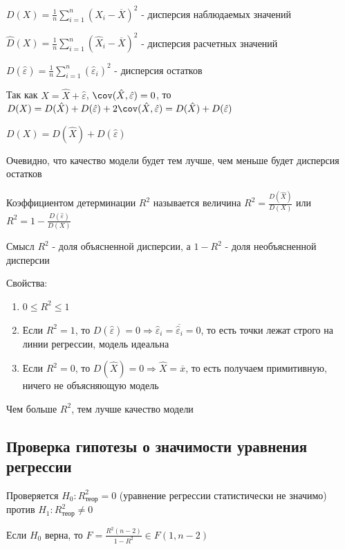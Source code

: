 \Def $D(X) = \frac{1}{n} \sum_{i = 1}^n (X_i - \overline{X})^2$ - дисперсия наблюдаемых значений

\Defs $\hat D(X) = \frac{1}{n} \sum_{i = 1}^n (\hat X_i - \overline{X})^2$ - дисперсия расчетных значений

\Defs $D(\hat \varepsilon) = \frac{1}{n} \sum_{i = 1}^n (\hat \varepsilon_i)^2$ - дисперсия остатков

Так как $X = \hat X + \hat \varepsilon$, $\cov (\hat X, \hat \varepsilon) = 0$, то $D(X) = D(\hat X) + D(\hat \varepsilon) + 2\cov (\hat X, \hat \varepsilon) = D(\hat X) + D(\hat \varepsilon)$

\begin{MyTheorem}
    \Ths $D(X) = D(\hat X) + D(\hat \varepsilon)$
\end{MyTheorem}

Очевидно, что качество модели будет тем лучше, чем меньше будет дисперсия остатков

\Def Коэффициентом детерминации $R^2$ называется величина $R^2 = \frac{D(\hat X)}{D(X)}$ или $R^2 = 1 - \frac{D(\hat \varepsilon)}{D(X)}$

\Notas Смысл $R^2$ - доля объясненной дисперсии, а $1 - R^2$ - доля необъясненной дисперсии

Свойства: 

\begin{enumerate}
    \item $0 \leq R^2 \leq 1$
    \item Если $R^2 = 1$, то $D(\hat \varepsilon) = 0 \Longrightarrow \hat \varepsilon_i = \overline{\hat \varepsilon_i} = 0$, то есть точки лежат строго на 
    линии регрессии, модель идеальна

    \item Если $R^2 = 0$, то $D(\hat X) = 0 \Longrightarrow \hat X = \overline{x}$, то есть получаем примитивную, ничего не объясняющую модель
\end{enumerate}

Чем больше $R^2$, тем лучше качество модели

\subsection{Проверка гипотезы о значимости уравнения регрессии}

Проверяется $H_0 : R^2_\text{теор} = 0$ (уравнение регрессии статистически не значимо) против $H_1 : R^2_\text{теор} \neq 0$

\begin{MyTheorem}
    \Ths Если $H_0$ верна, то $F = \frac{R^2 (n - 2)}{1 - R^2} \in F(1, n - 2)$
\end{MyTheorem}

